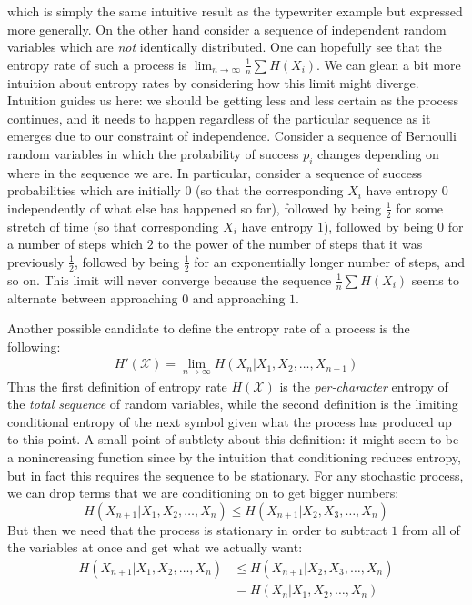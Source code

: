 which is simply the same intuitive result as the typewriter example but expressed more generally. On the other hand consider a sequence of independent random variables which are \emph{not} identically distributed. One can hopefully see that the entropy rate of such a process is $\lim_{n \to \infty} \frac{1}{n}\sum H(X_i)$. We can glean a bit more intuition about entropy rates by considering how this limit might diverge. Intuition guides us here: we should be getting less and less certain as the process continues, and it needs to happen regardless of the particular sequence as it emerges due to our constraint of independence. Consider a sequence of Bernoulli random variables in which the probability of success $p_i$ changes depending on where in the sequence we are. In particular, consider a sequence of success probabilities which are initially $0$ (so that the corresponding $X_i$ have entropy $0$ independently of what else has happened so far), followed by being $\frac{1}{2}$ for some stretch of time (so that corresponding $X_i$ have entropy $1$), followed by being $0$ for a number of steps which $2$ to the power of the number of steps that it was previously $\frac{1}{2}$, followed by being $\frac{1}{2}$ for an exponentially longer number of steps, and so on. This limit will never converge because the sequence $\frac{1}{n}\sum H(X_i)$ seems to alternate between approaching $0$ and approaching $1$. \par 
Another possible candidate to define the entropy rate of a process is the following:
\begin{align}
	H'(\mathcal{X}) = \lim_{n \to \infty} H(X_n|X_1,X_2,\ldots,X_{n-1}) 
\end{align} 
Thus the first definition of entropy rate $H(\mathcal{X})$ is the \emph{per-character} entropy of the \emph{total sequence} of random variables, while the second definition is the limiting conditional entropy of the next symbol given what the process has produced up to this point. A small point of subtlety about this definition: it might seem to be a nonincreasing function since by the intuition that conditioning reduces entropy, but in fact this requires the sequence to be stationary. For any stochastic process, we can drop terms that we are conditioning on to get bigger numbers:
\[ H(X_{n+1}|X_1,X_2,\ldots,X_n) \leq H(X_{n+1}|X_2,X_3,\ldots,X_n) \]
But then we need that the process is stationary in order to subtract $1$ from all of the variables at once and get what we actually want:
\begin{align}
	H(X_{n+1}|X_1,X_2,\ldots,X_n) &\leq H(X_{n+1}|X_2,X_3,\ldots,X_n) \\
								&= H(X_n|X_1,X_2,\ldots,X_n)
\end{align}
